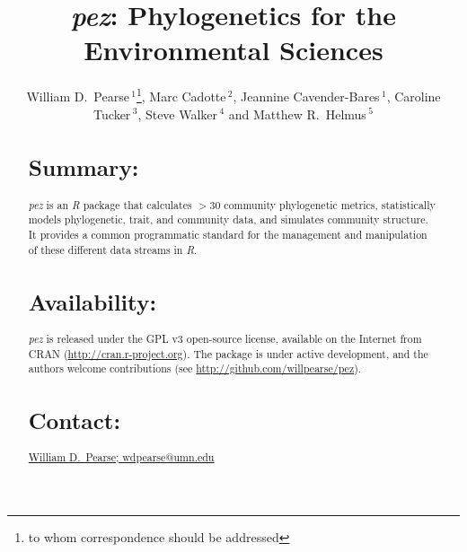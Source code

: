 \documentclass{bioinfo}
\begin{document}

\title[\emph{pez}]{\emph{pez}: Phylogenetics for the Environmental
  Sciences} \author[Pearse \textit{et~al}]{William D.\
  Pearse\,$^{1}$\footnote{to whom correspondence should be addressed},
  Marc Cadotte\,$^{2}$, Jeannine Cavender-Bares\,$^1$, Caroline
  Tucker\,$^{3}$, Steve Walker\,$^{4}$ and Matthew R.\ Helmus\,$^5$}
\address{$^{1}$Department of Ecology, Evolution, and Behavior,
  University of Minnesota, 100 Ecology Building, 1987 Upper Buford
  Circle, Saint Paul, Minnesota, 55108, USA, $^{2}$Department of
  Biological Sciences, University of Toronto–Scarborough, 1265
  Military Trail, Scarborough, Ontario M1C 1A4, Canada
  $^{3}$Department of Ecology and Evolutionary Biology, University of
  Colorado, Boulder, CO, USA, $^{4}$Department of Mathematics and
  Statistics, McMaster University, Hamilton, Ontario L8S 4L8, Canada,
  $^{5}$Department of Animal Ecology, Vrije Universiteit, 1081 HV,
  Amsterdam, The Netherlands} \history{} \editor{}
\maketitle
\begin{abstract}
\section{Summary:}
\emph{pez} is an \emph{R} package that calculates $>$30 community
phylogenetic metrics, statistically models phylogenetic, trait, and
community data, and simulates community structure. It provides a
common programmatic standard for the management and manipulation of
these different data streams in \emph{R}.
\section{Availability:}
\emph{pez} is released under the GPL v3 open-source license, available
on the Internet from CRAN
(\href{http://cran.r-project.org}{http://cran.r-project.org}). The
package is under active development, and the authors welcome
contributions (see
\href{http://github.com/willpearse/pez}{http://github.com/willpearse/pez}).
\section{Contact:} \href{wdpearse@umn.edu}{William D.\ Pearse; wdpearse@umn.edu}
\end{abstract}
\end{document}
